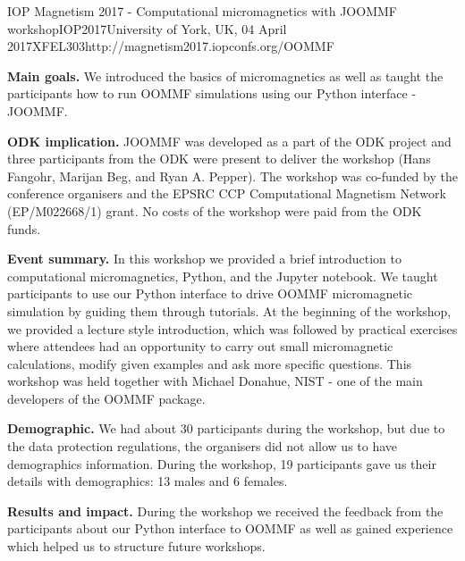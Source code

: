 \begin{event}{IOP Magnetism 2017 - Computational micromagnetics with JOOMMF workshop}{IOP2017}{University of York, UK, 04 April 2017}{XFEL}{30}{3}{http://magnetism2017.iopconfs.org/OOMMF}

\textbf{Main goals.} We introduced the basics of micromagnetics as well as taught the participants how to run OOMMF simulations using our Python interface - JOOMMF.

\textbf{ODK implication.} JOOMMF was developed as a part of the ODK project and three participants from the ODK were present to deliver the workshop (Hans Fangohr, Marijan Beg, and Ryan A. Pepper). The workshop was co-funded by the conference organisers and the EPSRC CCP Computational Magnetism Network (EP/M022668/1) grant. No costs of the workshop were paid from the ODK funds.

\textbf{Event summary.} In this workshop we provided a brief introduction to computational micromagnetics, Python, and the Jupyter notebook. We taught participants to use our Python interface to drive OOMMF micromagnetic simulation by guiding them through tutorials. At the beginning of the workshop, we provided a lecture style introduction, which was followed by practical exercises where attendees had an opportunity to carry out small micromagnetic calculations, modify given examples and ask more specific questions. This workshop was held together with Michael Donahue, NIST - one of the main developers of the OOMMF package.

\textbf{Demographic.} We had about 30 participants during the workshop, but due to the data protection regulations, the organisers did not allow us to have demographics information. During the workshop, 19 participants gave us their details with demographics: 13 males and 6 females.

\textbf{Results and impact.} During the workshop we received the feedback from the participants about our Python interface to OOMMF as well as gained experience which helped us to structure future workshops.

\end{event}
